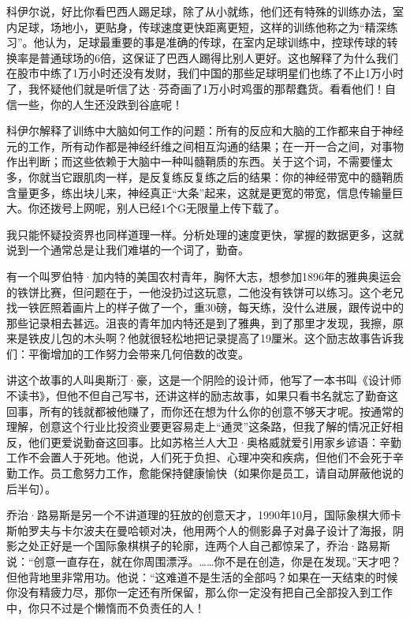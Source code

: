 科伊尔说，好比你看巴西人踢足球，除了从小就练，他们还有特殊的训练办法，室内足球，场地小，更贴身，传球速度更快距离更短，这样的训练他称之为``精深练习''。他认为，足球最重要的事是准确的传球，在室内足球训练中，控球传球的转换率是普通球场的6倍，这保证了巴西人踢得比别人更好。这也解释了为什么我们在股市中练了1万小时还没有发财，我们中国的那些足球明星们也练了不止1万小时了，我怀疑他们就是听信了达·芬奇画了1万小时鸡蛋的那帮蠢货。看看他们！自信一些，你的人生还没跌到谷底呢！

科伊尔解释了训练中大脑如何工作的问题：所有的反应和大脑的工作都来自于神经元的工作，所有动作都是神经纤维之间相互沟通的结果；在一开一合之间，对事物作出判断；而这些依赖于大脑中一种叫髓鞘质的东西。关于这个词，不需要懂太多，你就当它跟肌肉一样，是反复练反复练之后的结果：你的神经带宽中的髓鞘质含量更多，练出块儿来，神经真正``大条''起来，这就是更宽的带宽，信息传输量巨大。你还拨号上网呢，别人已经1个G无限量上传下载了。

我只能怀疑投资界也同样道理一样。分析处理的速度更快，掌握的数据更多，这就说到一个通常总是让我们难堪的一个词了，勤奋。

有一个叫罗伯特·加内特的美国农村青年，胸怀大志，想参加1896年的雅典奥运会的铁饼比赛，但问题在于，一他没扔过这玩意，二他没有铁饼可以练习。这个老兄找一铁匠照着画片上的样子做了一个，重30磅，每天练，没什么进展，跟传说中的那些记录相去甚远。沮丧的青年加内特还是到了雅典，到了那里才发现，我擦，原来是铁皮儿包的木头啊？他就很轻松地把记录提高了19厘米。这个励志故事告诉我们：平衡增加的工作努力会带来几何倍数的改变。

讲这个故事的人叫奥斯汀·豪，这是一个阴险的设计师，他写了一本书叫《设计师不读书》，但他不但自己写书，还讲这样的励志故事，如果只看书名就忘了勤奋这回事，所有的钱就都被他赚了，而你还在想为什么你的创意不够天才呢。按通常的理解，创意这个行业比投资业要更容易走上``通灵''这条路，但我了解的情况正好相反，他们更爱说勤奋这回事。比如苏格兰人大卫·奥格威就爱引用家乡谚语：辛勤工作不会置人于死地。他说，人们死于负担、心理冲突和疾病，但他们不会死于辛勤工作。员工愈努力工作，愈能保持健康愉快（如果你是员工，请自动屏蔽他说的后半句）。

乔治·路易斯是另一个不讲道理的狂放的创意天才，1990年10月，国际象棋大师卡斯帕罗夫与卡尔波夫在曼哈顿对决，他用两个人的侧影鼻子对鼻子设计了海报，阴影之处正好是一个国际象棋棋子的轮廓，连两个人自己都惊呆了，乔治·路易斯说：``创意一直存在，就在你周围漂浮。\ldots\ldots 你不是在创造，你是在发现。''天才吧？但他背地里非常用功。他说：``这难道不是生活的全部吗？如果在一天结束的时候你没有精疲力尽，那你一定还有所保留，那么你一定没有把自己全部投入到工作中，你只不过是个懒惰而不负责任的人！

